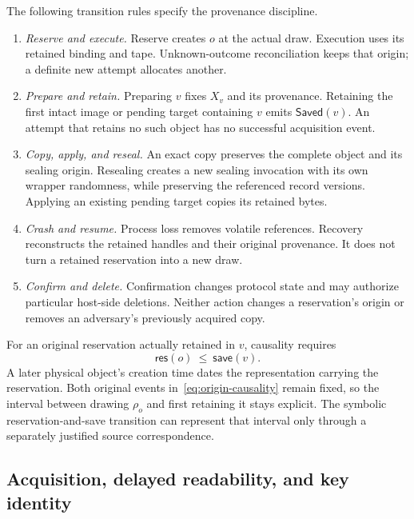 The following transition rules specify the provenance discipline.

\begin{enumerate}
  \item \emph{Reserve and execute.}  Reserve creates $o$ at the actual draw.
  Execution uses its retained binding and tape.  Unknown-outcome
  reconciliation keeps that origin; a definite new attempt allocates another.
  \item \emph{Prepare and retain.}  Preparing $v$ fixes $X_v$ and its provenance.
  Retaining the first intact image or pending target containing $v$ emits
  $\mathsf{Saved}(v)$.  An attempt that retains no such object has no successful
  acquisition event.
  \item \emph{Copy, apply, and reseal.}  An exact copy preserves the complete
  object and its sealing origin. Resealing creates a new sealing invocation
  with its own wrapper randomness, while preserving the referenced
  record versions.  Applying an existing pending target copies its retained
  bytes.
  \item \emph{Crash and resume.}  Process loss removes volatile references.
  Recovery reconstructs the retained handles and their original provenance.
  It does not turn a retained reservation into a new draw.
  \item \emph{Confirm and delete.}  Confirmation changes protocol state and may
  authorize particular host-side deletions.  Neither action changes a
  reservation's origin or removes an adversary's previously acquired copy.
\end{enumerate}

For an original reservation actually retained in $v$, causality requires
\begin{equation}
  \mathsf{res}(o)\ \leq\ \mathsf{save}(v).
  \label{eq:origin-causality}
\end{equation}
A later physical object's creation time dates the representation carrying
the reservation. Both original events in~\eqref{eq:origin-causality} remain
fixed, so the interval between drawing $\rho_o$ and first retaining it stays
explicit. The symbolic reservation-and-save transition can represent that
interval only through a separately justified source correspondence.

\subsection{Acquisition, delayed readability, and key identity}

